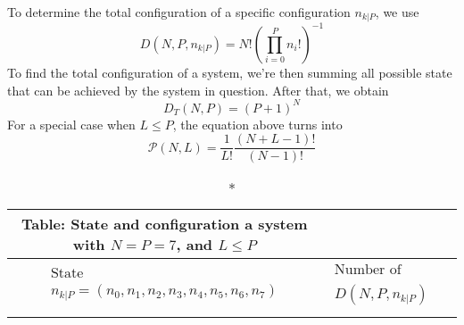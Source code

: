 \documentclass[../../../Main.tex]{subfiles}
\begin{document}
To determine the total configuration of a specific configuration $n_{k|P}$, we use
\begin{equation*}
    D(N,P,n_{k|P})= N!\left(\prod_{i=0}^{P}n_i!\right)^{-1}
\end{equation*}
To find the total configuration of a system, we're then summing all possible state that can be achieved by the system in question. After that, we obtain
\begin{equation*}
    D_T(N,P)=(P+1)^N
\end{equation*}
For a special case when $L\leq P$, the equation above turns into
\begin{equation*}
\mathcal{P}(N,L)=\frac{1}{L!}\frac{(N+L-1)!}{(N-1)!}
\end{equation*}

\begin{longtable}{c||c}
    \caption*{Table: State and configuration a system with $N=P=7$}, and $L\leq P$\\
    \hline\hline
    $\begin{array}{c}\text{State} \\n_{k|P}=(n_0,n_1,n_2, n_3, n_4, n_5, n_6, n_7)\end{array}$&$\begin{array}{c}\text{Number of configuration}\\  D(N,P,n_{k|P})\end{array}$\\ 
    \hline\hline\\


\end{longtable}
\end{document}
